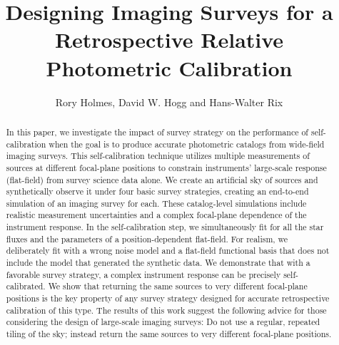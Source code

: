 \documentclass[preprint,pdftex]{aastex}
\begin{document}

\title{Designing Imaging Surveys for a Retrospective Relative Photometric Calibration}


\author{Rory Holmes, David W. Hogg and Hans-Walter Rix}

\begin{abstract}
In this paper, we investigate the impact of survey strategy on the performance of self-calibration when the goal is to produce accurate photometric catalogs from wide-field imaging surveys. This self-calibration technique utilizes multiple measurements of sources at different focal-plane positions to constrain instruments' large-scale response (flat-field) from survey science data alone. We create an artificial sky of sources and synthetically observe it under four basic survey strategies, creating an end-to-end simulation of an imaging survey for each. These catalog-level simulations include realistic measurement uncertainties
and a complex focal-plane dependence of the instrument response. In the self-calibration step, we simultaneously fit for all the star fluxes and the parameters of a position-dependent flat-field.  For realism, we deliberately fit with a wrong noise model and a flat-field functional basis that does not include the model that generated the synthetic data.  We demonstrate that with a favorable survey strategy, a complex instrument response can be precisely self-calibrated. We show that returning the same sources to very
different focal-plane positions is the key property of any survey strategy designed for accurate retrospective calibration of this type. The results of this work suggest the following advice for those considering the design of large-scale imaging surveys: Do not use a regular, repeated tiling of the sky; instead return the same sources to very different focal-plane positions.
\end{abstract}
\end{document}
